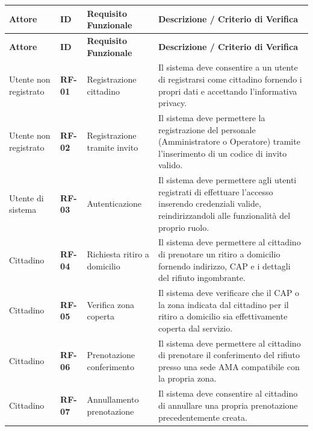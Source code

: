 \begin{center}
\renewcommand{\arraystretch}{1.3}
\begin{longtable}{|p{3.5cm}|p{1.5cm}|p{4.2cm}|p{6cm}|}
\hline
\rowcolor{tableheader} \textbf{Attore} & \textbf{ID} & \textbf{Requisito Funzionale} & \textbf{Descrizione / Criterio di Verifica} \\ \hline
\endfirsthead

\hline
\rowcolor{tableheader} \textbf{Attore} & \textbf{ID} & \textbf{Requisito Funzionale} & \textbf{Descrizione / Criterio di Verifica} \\ \hline
\endhead

Utente non registrato & \textbf{RF-01} & Registrazione cittadino & Il sistema deve consentire a un utente di registrarsi come cittadino fornendo i propri dati e accettando l'informativa privacy. \\ \hline

Utente non registrato & \textbf{RF-02} & Registrazione tramite invito & Il sistema deve permettere la registrazione del personale (Amministratore o Operatore) tramite l'inserimento di un codice di invito valido. \\ \hline

Utente di sistema & \textbf{RF-03} & Autenticazione & Il sistema deve permettere agli utenti registrati di effettuare l'accesso inserendo credenziali valide, reindirizzandoli alle funzionalità del proprio ruolo. \\ \hline

Cittadino & \textbf{RF-04} & Richiesta ritiro a domicilio & Il sistema deve permettere al cittadino di prenotare un ritiro a domicilio fornendo indirizzo, CAP e i dettagli del rifiuto ingombrante. \\ \hline

Cittadino & \textbf{RF-05} & Verifica zona coperta & Il sistema deve verificare che il CAP o la zona indicata dal cittadino per il ritiro a domicilio sia effettivamente coperta dal servizio. \\ \hline

Cittadino & \textbf{RF-06} & Prenotazione conferimento & Il sistema deve permettere al cittadino di prenotare il conferimento del rifiuto presso una sede AMA compatibile con la propria zona. \\ \hline

Cittadino & \textbf{RF-07} & Annullamento prenotazione & Il sistema deve consentire al cittadino di annullare una propria prenotazione precedentemente creata. \\ \hline


\end{longtable}
\end{center}
